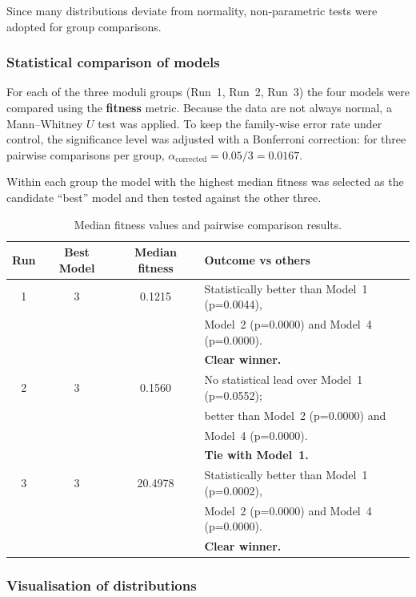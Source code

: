 \documentclass[runningheads]{llncs}
\begin{document}
Since many distributions deviate from normality,
non‑parametric tests were adopted for group comparisons.

\subsubsection{Statistical comparison of models}

For each of the three moduli groups (Run~1, Run~2, Run~3) the four
models were compared using the \textbf{fitness} metric.  Because the
data are not always normal, a Mann–Whitney \(U\) test was applied.
To keep the family‑wise error rate under control, the significance
level was adjusted with a Bonferroni correction: for three pairwise
comparisons per group, \(\alpha_{\text{corrected}} = 0.05 / 3 = 0.0167\).

Within each group the model with the highest median fitness was
selected as the candidate “best” model and then tested against the
other three.

\begin{table}[h]
\centering
\caption{Median fitness values and pairwise comparison results.}
\label{tab:statistical_comparison}
\begin{tabular}{c c c l}
\hline
\textbf{Run} & \textbf{Best Model} & \textbf{Median fitness} & \textbf{Outcome vs others} \\
\hline
1 & 3 & 0.1215 & Statistically better than Model~1 (p=0.0044), \\
     &      &        & Model~2 (p=0.0000) and Model~4 (p=0.0000). \\
     &      &        & \textbf{Clear winner.} \\
\hline
2 & 3 & 0.1560 & No statistical lead over Model~1 (p=0.0552); \\
     &      &        & better than Model~2 (p=0.0000) and \\
     &      &        & Model~4 (p=0.0000). \\
     &      &        & \textbf{Tie with Model~1.} \\
\hline
3 & 3 & 20.4978 & Statistically better than Model~1 (p=0.0002), \\
     &      &        & Model~2 (p=0.0000) and Model~4 (p=0.0000). \\
     &      &        & \textbf{Clear winner.} \\
\hline
\end{tabular}
\end{table}

\subsubsection{Visualisation of distributions}
\end{document}
